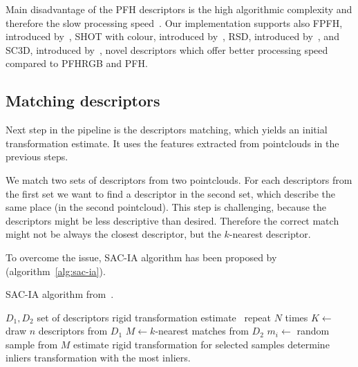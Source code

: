 Main disadvantage of the \gls{PFH} descriptors is the high algorithmic complexity and therefore the slow processing speed~\citep{rusu2009fpfh}. Our implementation supports also \gls{FPFH}, introduced by~\citet{rusu2009fpfh}, \gls{SHOT} with colour, introduced by~\citet{tombari2011shot}, \gls{RSD}, introduced by~\citet{marton2010rsd}, and \gls{SC3D}, introduced by~\citet{frome2004sc3d}, novel descriptors which offer better processing speed compared to \gls{PFHRGB} and \gls{PFH}.

\subsection{Matching descriptors}
\label{sec:matching}

Next step in the pipeline is the descriptors matching, which yields an initial transformation estimate. It uses the features extracted from pointclouds in the previous steps.

We match two sets of descriptors from two pointclouds. For each descriptors from the first set we want to find a descriptor in the second set, which describe the same place (in the second pointcloud). This step is challenging, because the descriptors might be less descriptive than desired. Therefore the correct match might not be always the closest descriptor, but the $k$-nearest descriptor.

To overcome the issue, \gls{SAC-IA} algorithm has been proposed by~\citet{rusu2009fpfh} (algorithm~\ref{alg:sac-ia}).

\begin{algorithm}
    \caption[\gls{SAC-IA}]{\gls{SAC-IA} algorithm from~\citet{rusu2009fpfh}.}
    \label{alg:sac-ia}
    \begin{algorithmic}[1]
        \Require $D_1, D_2$ set of descriptors
        \Ensure rigid transformation estimate
            \Loop~repeat $N$ times
                \State $K \gets$ draw $n$ descriptors from $D_1$
                    \State $M \gets k$-nearest matches from $D_2$
                    \State $m_i \gets$ random sample from $M$
                \EndFor
                \State estimate rigid transformation for selected samples
                \State determine inliers
            \EndLoop
            \State \Return transformation with the most inliers.
        \EndFunction
    \end{algorithmic}
\end{algorithm}

